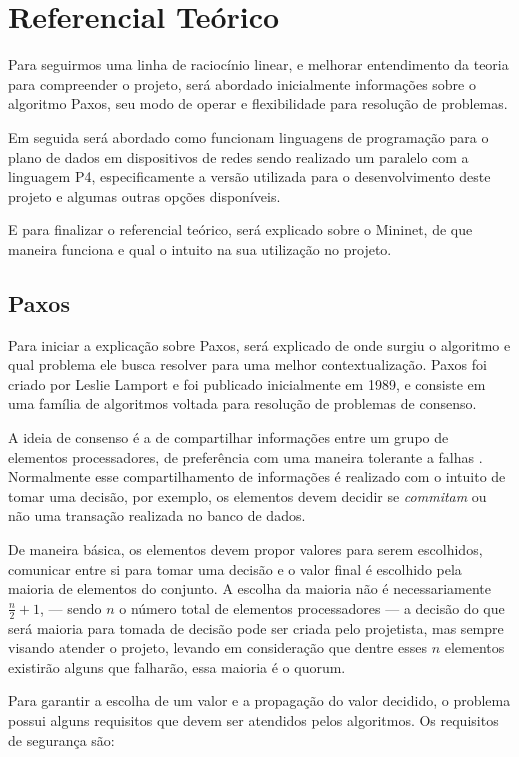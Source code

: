 \documentclass[12pt,
openright, 
oneside,
a4paper,
brazil]{facom-ufu-abntex2}
\theoremstyle{definition}
\begin{document}
\section{Referencial Teórico}
Para seguirmos uma linha de raciocínio linear, e melhorar entendimento da teoria
para compreender o projeto, será abordado inicialmente informações sobre o 
algoritmo Paxos, seu modo de operar e flexibilidade para resolução de problemas.

Em seguida será abordado como funcionam linguagens de programação para o plano de
dados em dispositivos de redes sendo realizado um paralelo com a linguagem P4, 
especificamente a versão utilizada para o desenvolvimento deste projeto e algumas
outras opções disponíveis.

E para finalizar o referencial teórico, será explicado sobre o Mininet, de que
maneira funciona e qual o intuito na sua utilização no projeto.

\subsection{Paxos}
Para iniciar a explicação sobre Paxos, será explicado de onde surgiu o algoritmo e qual
problema ele busca resolver para uma melhor contextualização. Paxos foi criado por 
Leslie Lamport e foi publicado inicialmente em 1989, e consiste em uma família de algoritmos
voltada para resolução de problemas de consenso. 

A ideia de consenso é a de compartilhar informações entre um grupo de elementos
processadores, de preferência com uma maneira tolerante a falhas \citep{barborak1993consensus}.
Normalmente esse compartilhamento de informações é realizado com o intuito de tomar
uma decisão, por exemplo, os elementos devem decidir se \textit{commitam} ou não
uma transação realizada no banco de dados. 

De maneira básica, os elementos devem propor valores para serem escolhidos, 
comunicar entre si para tomar uma decisão e o valor final é escolhido pela maioria de 
elementos do conjunto.
A escolha da maioria não é necessariamente $\frac{n}{2}+1$, --- sendo $n$ o número
total de elementos processadores --- a decisão do que será maioria para tomada de decisão
pode ser criada pelo projetista, mas sempre visando atender o projeto, levando
em consideração que dentre esses $n$ elementos existirão alguns que falharão, essa maioria
é o quorum.

Para garantir a escolha de um valor e a propagação do valor decidido, o problema
possui alguns requisitos que devem ser atendidos pelos algoritmos. Os requisitos de
segurança são:
\end{document}
